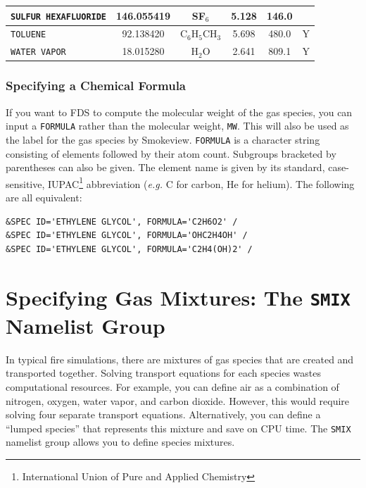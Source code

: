 \documentclass[11pt]{book}
\newcommand{\ct}{\tt\small}
\begin{document}
\begin{table}[ht]
\begin{center}
\begin{tabular}{|l|c|c|c|c|c|}
{\ct SULFUR HEXAFLUORIDE}& 146.055419 & SF$_6$           & 5.128    & 146.0           &        \\ \hline
{\ct TOLUENE}            & 92.138420 & C$_6$H$_5$CH$_3$ & 5.698    & 480.0           &    Y   \\ \hline
{\ct WATER VAPOR}        & 18.015280 & H$_2$O           & 2.641    & 809.1           &    Y   \\ \hline
\end{tabular}
\end{center}
\end{table}


\subsubsection{Specifying a Chemical Formula}

If you want to FDS to compute the molecular weight of the gas species, you can input a {\ct FORMULA} rather than the molecular weight, {\ct MW}.
This will also be used as the label for the gas species by Smokeview.  {\ct FORMULA} is a character string consisting of elements followed by their atom count.
Subgroups bracketed by parentheses can also be given.  The element name is given by its standard, case-sensitive, IUPAC\footnote{International Union of Pure
and Applied Chemistry} abbreviation ({\em e.g.} C for carbon, He for helium).
The following are all equivalent:

\footnotesize
\begin{verbatim}
&SPEC ID='ETHYLENE GLYCOL', FORMULA='C2H6O2' /
&SPEC ID='ETHYLENE GLYCOL', FORMULA='OHC2H4OH' /
&SPEC ID='ETHYLENE GLYCOL', FORMULA='C2H4(OH)2' /
\end{verbatim} \normalsize


\clearpage

\section{Specifying Gas Mixtures: The \texorpdfstring{{\tt SMIX}}{SMIX} Namelist Group}
\label{info:SMIX}

In typical fire simulations, there are mixtures of gas species that are created and transported together.
Solving transport equations for each species wastes computational resources.
For example, you can define air as a combination of nitrogen, oxygen, water vapor, and carbon dioxide.
However, this would require solving four separate transport equations.
Alternatively, you can define a ``lumped species'' that represents this mixture and save on CPU time.
The {\ct SMIX} namelist group allows you to define species mixtures.
\end{document}

